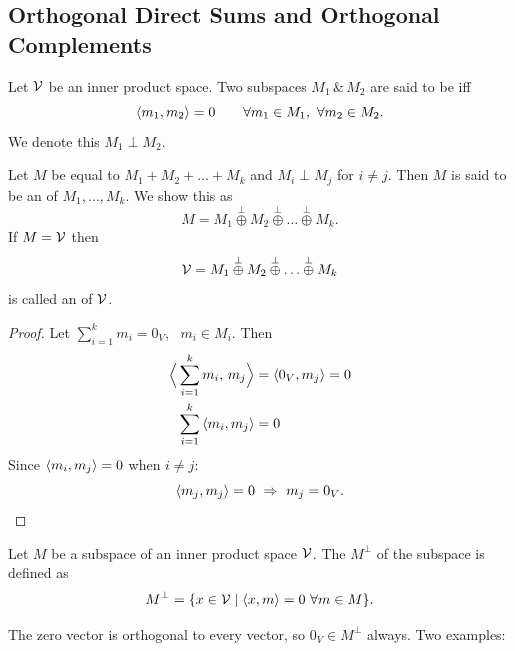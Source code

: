 \subsection{Orthogonal Direct Sums and Orthogonal Complements}\label{ss:orth-complement}

\begin{definition}\leavevmode{}
Let $\mathcal{V}$ be an inner product space. Two subspaces $M_1\,\&\,M_2$ are said to be  iff
\[
\left\langle m_1, m_2 \right\rangle=0 \qquad \forall m_1\in M_1,\ \forall m_2\in M_2 .
\]
We denote this $M_1\perp M_2$.
\end{definition}

\begin{definition}
Let $M$ be equal to $M_1+M_2+\dots+M_k$ and $M_i\perp M_j$ for $i\ne j$. Then $M$ is said to be an  of $M_1,\dots,M_k$. We show this as
\[
M=M_1\overset{\perp}{\oplus}M_2\overset{\perp}{\oplus}\dots\overset{\perp}{\oplus}M_k .
\]
If $M=\mathcal{V}$ then
\[
\mathcal{V}=M_1\overset{\perp}{\oplus}M_2\overset{\perp}{\oplus}\dots\overset{\perp}{\oplus}M_k
\]
is called an  of $\mathcal{V}$.
\end{definition}

\begin{claim}
\end{claim}
\begin{proof}
Let $\sum_{i=1}^{k}m_i=0_V$, \ $m_i\in M_i$. Then
\begin{align*}
\Big\langle\sum_{i=1}^{k}m_i,\,m_j\Big\rangle&=\left\langle 0_V, m_j \right\rangle=0\\
\sum_{i=1}^{k}\left\langle m_i, m_j \right\rangle&=0
\end{align*}
Since $\left\langle m_i, m_j \right\rangle=0$ when $i\ne j$:
\[
\left\langle m_j, m_j \right\rangle=0 \ \Rightarrow\ m_j=0_V .
\]
\end{proof}

\begin{definition}
Let $M$ be a subspace of an inner product space $\mathcal{V}$. The  $M^\perp$ of the subspace is defined as
\[
M^\perp=\{x\in\mathcal{V}\mid \left\langle x, m \right\rangle=0\ \forall m\in M\}.
\]
\end{definition}
The zero vector is orthogonal to every vector, so $0_V\in M^\perp$ always. Two examples:

